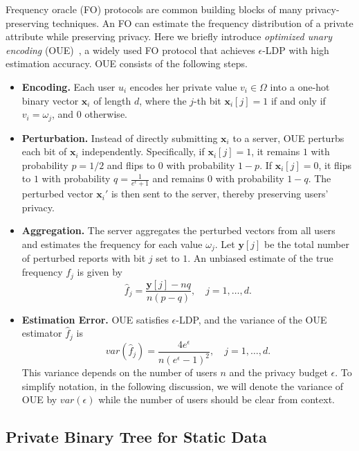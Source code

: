 \documentclass[acmsmall]{acmart}
\newcommand{\var}{\mathit{var}}
\newcommand{\bx}{\mathbf{x}}
\newcommand{\by}{\mathbf{y}}
\begin{document}
Frequency oracle (FO) protocols are common building blocks of many
privacy-preserving techniques.
An FO can estimate the frequency distribution of a private attribute while
preserving privacy.
Here we briefly introduce \emph{optimized unary encoding} (OUE)~\cite{Wang2017l},
a widely used FO protocol that achieves $\epsilon$-LDP with high estimation
accuracy.
OUE consists of the following steps.
\begin{itemize}
\item{\textbf{Encoding.}} 
Each user $u_i$ encodes her private value $v_i\in\Omega$ into a one-hot binary
vector $\bx_i$ of length $d$, where the $j$-th bit $\bx_i[j] = 1$ if and only if
$v_i= \omega_j$, and $0$ otherwise.
\item{\textbf{Perturbation.}}
Instead of directly submitting $\bx_i$ to a server, OUE perturbs each bit of
$\bx_i$ independently.
Specifically, if $\bx_i[j]=1$, it remains $1$ with probability $p = 1/2$ and
flips to $0$ with probability $1-p$.
If $\bx_i[j]=0$, it flips to $1$ with probability $q = \frac{1}{e^\epsilon + 1}$
and remains $0$ with probability $1-q$.
The perturbed vector $\bx_i'$ is then sent to the server, thereby preserving
users' privacy.
\item{\textbf{Aggregation.}}
The server aggregates the perturbed vectors from all users and estimates the
frequency for each value $\omega_j$.
Let $\by[j]$ be the total number of perturbed reports with bit $j$ set to $1$.
An unbiased estimate of the true frequency $f_j$ is given by
\[
  \hat{f}_j = \frac{\by[j] - nq}{n(p - q)}, \quad j=1,\ldots,d.
\]
\item{\textbf{Estimation Error.}}
OUE satisfies $\epsilon$-LDP, and the variance of the OUE estimator $\hat{f}_j$
is
\[
  \var(\hat{f}_j) = \frac{4e^\epsilon}{n(e^\epsilon - 1)^2}, \quad j=1,\ldots,d.
\]
This variance depends on the number of users $n$ and the privacy budget
$\epsilon$.
To simplify notation, in the following discussion, we will denote the variance
of OUE by $\var(\epsilon)$ while the number of users should be clear from
context.
\end{itemize}



\subsection{Private Binary Tree for Static Data}
\label{ss:tree}
\end{document}
